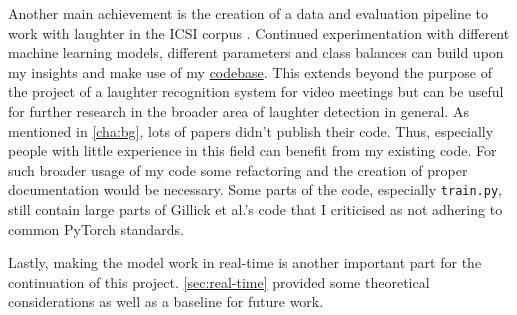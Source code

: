 \documentclass[bsc,frontabs,parskip,deptreport]{infthesis}
\newcommand{\coderepo}{\href{https://github.com/LasseWolter/laughter-detection-icsi}{codebase}}
\begin{document}
Another main achievement is the creation of a data and evaluation pipeline to work with laughter in the ICSI corpus \citep{morgan2001meeting}. 
Continued experimentation with different machine learning models, different parameters and class balances can build upon my insights and make use of my \coderepo.
This extends beyond the purpose of the project of a laughter recognition system for video meetings but can be useful for further research in the broader area of laughter detection in general. 
As mentioned in \autoref{cha:bg}, lots of papers didn't publish their code.
Thus, especially people with little experience in this field can benefit from my existing code. 
For such broader usage of my code some refactoring and the creation of proper documentation would be necessary.
Some parts of the code, especially \verb|train.py|, still contain large parts of Gillick et al.'s code that I criticised as not adhering to common PyTorch standards. 


Lastly, making the model work in real-time is another important part for the continuation of this project. \autoref{sec:real-time} provided some theoretical considerations as well as a baseline for future work.


\end{document}

